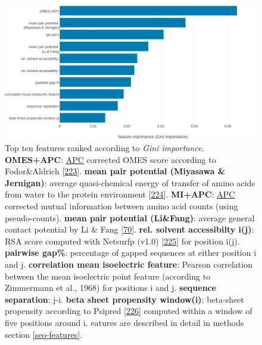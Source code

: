 \documentclass[11pt,a4paper,twoside]{book}
\theoremstyle{definition}
\theoremstyle{definition}
\theoremstyle{remark}
\begin{document}
\begin{figure}
\includegraphics[width=1\linewidth]{img/random_forest_contact_prior/feature_random_forest_optimalhyperparameters_topfeatures} \caption{Top ten features ranked according to
\emph{Gini importance}. \textbf{OMES+APC}:
\protect\hyperlink{abbrev}{APC} corrected OMES score according to
Fodor\&Aldrich {[}\protect\hyperlink{ref-Fodor2004a}{223}{]}.
\textbf{mean pair potential (Miyasawa \& Jernigan)}: average
quasi-chemical energy of transfer of amino acids from water to the
protein environment {[}\protect\hyperlink{ref-Miyazawa1999a}{224}{]}.
\textbf{MI+APC}: \protect\hyperlink{abbrev}{APC} corrected mutual
information between amino acid counts (using pseudo-counts).
\textbf{mean pair potential (Li\&Fang)}: average general contact
potential by Li \& Fang {[}\protect\hyperlink{ref-Li2011}{70}{]}.
\textbf{rel. solvent accessibilty i(j)}: RSA score computed with
Netsurfp (v1.0) {[}\protect\hyperlink{ref-Petersen2009a}{225}{]} for
position i(j). \textbf{pairwise gap\%}: percentage of gapped sequences
at either position i and j. \textbf{correlation mean isoelectric
feature}: Pearson correlation between the mean isoelectric point feature
(according to Zimmermann et al., 1968) for positions i and j.
\textbf{sequence separation}: \textbar{}j-i\textbar{}. \textbf{beta
sheet propensity window(i)}: beta-sheet propensity according to Psipred
{[}\protect\hyperlink{ref-Jones1999}{226}{]} computed within a window of
five positions around i. eatures are described in detail in methods
section \ref{seq-features}.}\label{fig:rf-feature-importance}
\end{figure}
\end{document}
